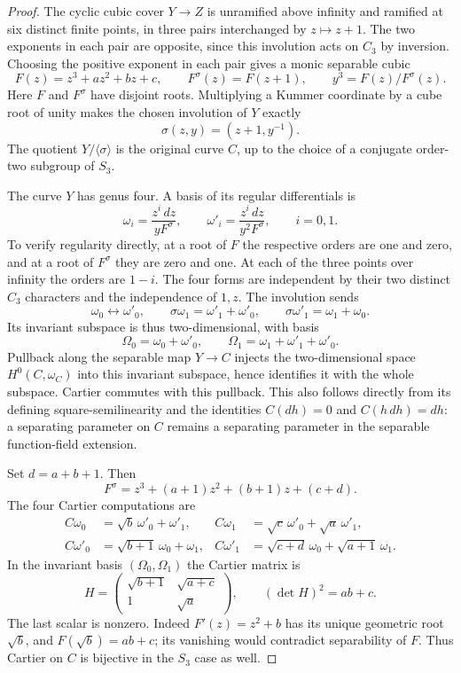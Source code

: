 \begin{proof}
The cyclic cubic cover $Y\to Z$ is unramified above infinity and
ramified at six distinct finite points, in three pairs interchanged
by $z\mapsto z+1$. The two exponents in each pair are opposite,
since this involution acts on $C_3$ by inversion. Choosing the
positive exponent in each pair gives a monic separable cubic
\[
 F(z)=z^3+a z^2+b z+c,\qquad
 F^\sigma(z)=F(z+1),\qquad
                    y^3=F(z)/F^\sigma(z).
\]
Here $F$ and $F^\sigma$ have disjoint roots. Multiplying a Kummer
coordinate by a cube root of unity makes the chosen involution of
$Y$ exactly
\[
                         \sigma(z,y)=(z+1,y^{-1}).
\]
The quotient $Y/\langle\sigma\rangle$ is the original curve $C$,
up to the choice of a conjugate order-two subgroup of $S_3$.

The curve $Y$ has genus four. A basis of its regular differentials is
\[
 \omega_i=\frac{z^i\,dz}{yF^\sigma},\qquad
 \omega'_i=\frac{z^i\,dz}{y^2F^\sigma},\qquad i=0,1.
\]
To verify regularity directly, at a root of $F$ the respective orders
are one and zero, and at a root of $F^\sigma$ they are zero and one.
At each of the three points over infinity the orders are $1-i$.
The four forms are independent by their two distinct $C_3$
characters and the independence of $1,z$.
The involution sends
\[
 \omega_0\longleftrightarrow\omega'_0,\qquad
 \sigma\omega_1=\omega'_1+\omega'_0,\qquad
 \sigma\omega'_1=\omega_1+\omega_0.
\]
Its invariant subspace is thus two-dimensional, with basis
\[
       \Omega_0=\omega_0+\omega'_0,\qquad
       \Omega_1=\omega_1+\omega'_1+\omega'_0.
\]
Pullback along the separable map $Y\to C$ injects the two-dimensional
space $H^0(C,\omega_C)$ into this invariant subspace, hence identifies
it with the whole subspace. Cartier commutes with this pullback.
This also follows directly from its defining square-semilinearity
and the identities $C(dh)=0$ and $C(h\,dh)=dh$: a separating
parameter on $C$ remains a separating parameter in the separable
function-field extension.

Set $d=a+b+1$. Then
\[
 F^\sigma=z^3+(a+1)z^2+(b+1)z+(c+d).
\]
The four Cartier computations are
\begin{align*}
 C\omega_0&=\sqrt b\,\omega'_0+\omega'_1,&
 C\omega_1&=\sqrt c\,\omega'_0+\sqrt a\,\omega'_1,\\
 C\omega'_0&=\sqrt{b+1}\,\omega_0+\omega_1,&
 C\omega'_1&=\sqrt{c+d}\,\omega_0+\sqrt{a+1}\,\omega_1.
\end{align*}
In the invariant basis $(\Omega_0,\Omega_1)$ the Cartier matrix is
\[
           H=\begin{pmatrix}
                \sqrt{b+1}&\sqrt{a+c}\\
                1&\sqrt a
              \end{pmatrix},\qquad
                         (\det H)^2=ab+c.
\]
The last scalar is nonzero. Indeed $F'(z)=z^2+b$ has its unique
geometric root $\sqrt b$, and $F(\sqrt b)=ab+c$; its vanishing
would contradict separability of $F$. Thus Cartier on $C$ is
bijective in the $S_3$ case as well.
\end{proof}

